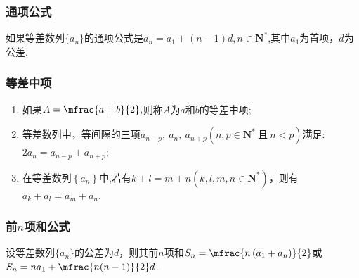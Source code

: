     \subsubsection{通项公式}
      如果等差数列$\{a_n\}$的通项公式是$ a_n=a_1+(n-1)d ,n\in\mathbf{N^*}$,其中$ a_1 $为首项，$ d $为公差.
    \subsubsection{等差中项}
      \begin{enumerate}[1)]
        \item 如果$ A=\mfrac{a+b}{2} ,$则称$ A $为$ a $和$ b $的等差中项;
        \item 等差数列中，等间隔的三项$a_{n-p},~a_n,~a_{n+p} (n,p\in\mathbf{N^*}~\text{且}~n<p) $满足:$ 2a_n=a_{n-p}+a_{n+p} $;
        \item 在等差数列$ \left\{a_n\right\} $中,若有$ k+l=m+n \left(k,l,m,n\in\mathbf{N^*}\right)$，则有$ a_k+a_l=a_m+a_n $.
      \end{enumerate}
    \subsubsection{前$ n $项和公式}
      设等差数列$\{a_n\}$的公差为$ d $，则其前$ n $项和$ S_n=\mfrac{n\left(a_1+a_n\right)}{2} $或$ S_n=na_1+\mfrac{n(n-1)}{2}d $.
